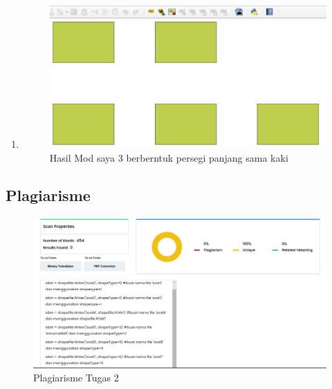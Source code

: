 \begin{enumerate}
    \item 
	
	\begin{figure}[H]
		\includegraphics[width=12cm]{figures/1174059/Python1/soal10.PNG}
		\centering
		\caption{Hasil Mod saya 3 berberntuk persegi panjang sama kaki}
	\end{figure}
\end{enumerate}

\subsection {Plagiarisme}
\begin{figure}[H]
		\includegraphics[width=12cm]{figures/1174059/plagiarisme2.PNG}
		\centering
		\caption{Plagiarisme Tugas 2}
	\end{figure}